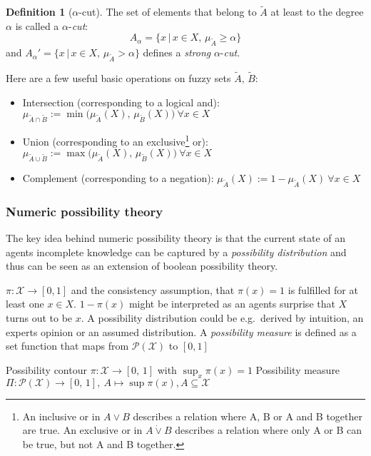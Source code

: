 \documentclass[
]{report}
\theoremstyle{definition}
\newtheorem{definition}{Definition}[section]
\begin{document}
\begin{definition}[$\alpha$-cut]
The set of elements that belong to $\tilde{A}$ at least to the degree $\alpha$ is called a $\alpha$-\textit{cut}:
$$A_{\alpha} = \big\{ x \, | \, x \in X, \, \mu_{\tilde{A}} \geq \alpha \big\}$$
and $A_{\alpha}' = \big\{ x \, | \, x \in X, \, \mu_{\tilde{A}} > \alpha \big\}$ defines a \textit{strong} $\alpha$-\textit{cut}. 
\end{definition}

Here are a few useful basic operations on fuzzy sets
\(\tilde{A}, \, \tilde{B}\):

\begin{itemize}
  \item Intersection (corresponding to a logical and): $\mu_{\tilde{A} \cap \tilde{B}} := \min \big( \mu_{\tilde{A}} (X), \, \mu_{\tilde{B}} (X) \big) \ \forall x \in X$
  \item Union (corresponding to an exclusive\footnote{An inclusive or in $A \lor B$ describes a relation where A, B or A and B together are true. An exclusive or in $A \dot\lor B$ describes a relation where only A or B can be true, but not A and B together.} or): $\mu_{\tilde{A} \cup \tilde{B}} := \max \big( \mu_{\tilde{A}} (X), \, \mu_{\tilde{B}} (X) \big) \ \forall x \in X$ 
  \item Complement (corresponding to a negation): $\mu_{\tilde{A}} (X) := 1 - \mu_{\tilde{A}} (X) \ \forall x \in X$
\end{itemize}

\subsubsection{Numeric possibility theory}

The key idea behind numeric possibility theory is that the current state
of an agents incomplete knowledge can be captured by a
\textit{possibility distribution} and thus can be seen as an extension
of boolean possibility theory.

\(\pi: \mathcal{X} \rightarrow [0, 1]\) and the consistency assumption,
that \(\pi (x) = 1\) is fulfilled for at least one \(x \in X\).
\(1 - \pi (x)\) might be interpreted as an agents surprise that \(X\)
turns out to be \(x\). A possibility distribution could be e.g.~derived
by intuition, an experts opinion or an assumed distribution. A
\textit{possibility measure} is defined as a set function that maps from
\(\mathcal{P} (\mathcal{X})\) to \([0,1]\)

Possibility contour \(\pi: \mathcal{X} \rightarrow [0, \, 1]\) with
\(\sup_x \pi (x) = 1\) Possibility measure
\(\Pi: \mathcal{P}(\mathcal{X}) \rightarrow [0, \, 1], \ A \mapsto \sup \pi (x), A \subseteq \mathcal{X}\)
\end{document}
